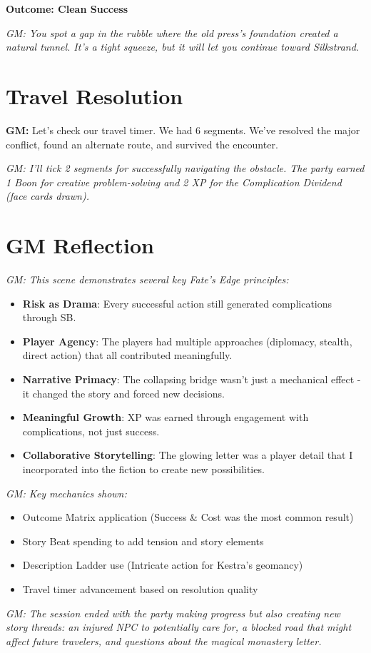 \documentclass[11pt]{article}
\newcommand{\player}[1]{\textbf{#1:}}
\newcommand{\gm}[1]{\textit{GM: #1}}
\newcommand{\outcome}[1]{\textbf{Outcome: #1}}
\begin{document}
\outcome{Clean Success}

\gm{You spot a gap in the rubble where the old press's foundation created a natural tunnel. It's a tight squeeze, but it will let you continue toward Silkstrand.}

\section*{Travel Resolution}

\player{GM} Let's check our travel timer. We had 6 segments. We've resolved the major conflict, found an alternate route, and survived the encounter.

\gm{I'll tick 2 segments for successfully navigating the obstacle. The party earned 1 Boon for creative problem-solving and 2 XP for the Complication Dividend (face cards drawn).}

\section*{GM Reflection}

\gm{This scene demonstrates several key Fate's Edge principles:}

\begin{itemize}[leftmargin=*]
\item \textbf{Risk as Drama}: Every successful action still generated complications through SB.
\item \textbf{Player Agency}: The players had multiple approaches (diplomacy, stealth, direct action) that all contributed meaningfully.
\item \textbf{Narrative Primacy}: The collapsing bridge wasn't just a mechanical effect - it changed the story and forced new decisions.
\item \textbf{Meaningful Growth}: XP was earned through engagement with complications, not just success.
\item \textbf{Collaborative Storytelling}: The glowing letter was a player detail that I incorporated into the fiction to create new possibilities.
\end{itemize}

\gm{Key mechanics shown:}
\begin{itemize}[leftmargin=*]
\item Outcome Matrix application (Success \& Cost was the most common result)
\item Story Beat spending to add tension and story elements
\item Description Ladder use (Intricate action for Kestra's geomancy)
\item Travel timer advancement based on resolution quality
\end{itemize}

\gm{The session ended with the party making progress but also creating new story threads: an injured NPC to potentially care for, a blocked road that might affect future travelers, and questions about the magical monastery letter.}
\end{document}
